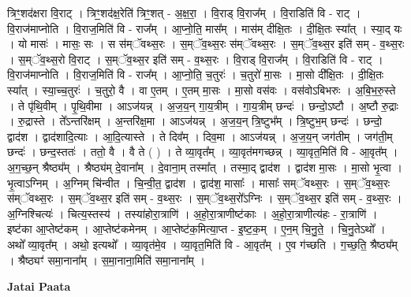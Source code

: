 \documentclass[17pt]{extarticle}
\begin{document}
त्रिꣳ॒॒शद॑क्षरा वि॒राट् । त्रिꣳ॒॒शद॑क्ष॒रेति॑ त्रिꣳ॒॒शत् - अ॒क्ष॒रा॒ । वि॒राड् वि॒राज᳚म् । वि॒राडिति॑ वि - राट् । वि॒राज॑माप्नोति । वि॒राज॒मिति॑ वि - राज᳚म् । आ॒प्नो॒ति॒ मास᳚म् । मास॑म् दीक्षि॒तः । दी॒क्षि॒तः स्या᳚त् । स्या॒द् यः । यो मासः॑ । मासः॒ सः । स स॑म्ॅवथ्स॒रः । स॒म्ॅव॒थ्स॒रः स॑म्ॅवथ्स॒रः । स॒म्ॅव॒थ्स॒र इति॑ सम् - व॒थ्स॒रः । स॒म्ॅव॒थ्स॒रो वि॒राट् । स॒म्ॅव॒थ्स॒र इति॑ सम् - व॒थ्स॒रः । वि॒राड् वि॒राज᳚म् । वि॒राडिति॑ वि - राट् । वि॒राज॑माप्नोति । वि॒राज॒मिति॑ वि - राज᳚म् । आ॒प्नो॒ति॒ च॒तुरः॑ । च॒तुरो॑ मा॒सः । मा॒सो दी᳚क्षि॒तः । दी॒क्षि॒तः स्या᳚त् । स्या॒च्च॒तुरः॑ । च॒तुरो॒ वै । वा ए॒तम् । ए॒तम् मा॒सः । मा॒सो वस॑वः । वस॑वोऽबिभरुः । अ॒बि॒भ॒रु॒स्ते । ते पृ॑थि॒वीम् । पृ॒थि॒वीमा । आऽज॑यन्न् । अ॒ज॒य॒न् गा॒य॒त्रीम् । गा॒य॒त्रीम् छन्दः॑ । छन्दो॒ऽष्टौ । अ॒ष्टौ रु॒द्राः । रु॒द्रास्ते । ते᳚ऽन्तरि॑क्षम् । अ॒न्तरि॑क्ष॒मा । आऽज॑यन्न् । अ॒ज॒य॒न् त्रि॒ष्टुभ᳚म् । त्रि॒ष्टुभ॒म् छन्दः॑ । छन्दो॒ द्वाद॑श । द्वाद॑शादि॒त्याः । आ॒दि॒त्यास्ते । ते दिव᳚म् । दिव॒मा । आऽज॑यन्न् । अ॒ज॒य॒न् जग॑तीम् । जग॑ती॒म् छन्दः॑ । छन्द॒स्ततः॑ । ततो॒ वै । वै ते ( ) । ते व्या॒वृत᳚म् । व्या॒वृत॑मगच्छन्न् । व्या॒वृत॒मिति॑ वि - आ॒वृत᳚म् । अ॒ग॒च्छ॒न् श्रैष्ठ्य᳚म् । श्रैष्ठ्य॑म् दे॒वाना᳚म् । दे॒वाना॒म् तस्मा᳚त् । तस्मा॒द् द्वाद॑श । द्वाद॑श मा॒सः । मा॒सो भृ॒त्वा । भृ॒त्वाऽग्निम् । अ॒ग्निम् चि॑न्वीत । चि॒न्वी॒त॒ द्वाद॑श । द्वाद॑श॒ मासाः᳚ । मासाः᳚ सम्ॅवथ्स॒रः । स॒म्ॅव॒थ्स॒रः स॑म्ॅवथ्स॒रः । स॒म्ॅव॒थ्स॒र इति॑ सम् - व॒थ्स॒रः । स॒म्ॅव॒थ्स॒रो᳚ऽग्निः । स॒म्ॅव॒थ्स॒र इति॑ सम् - व॒थ्स॒रः । अ॒ग्निश्चित्यः॑ । चित्य॒स्तस्य॑ । तस्या॑होरा॒त्राणि॑ । अ॒हो॒रा॒त्राणीष्ट॑काः । अ॒हो॒रा॒त्राणीत्य॑हः - रा॒त्राणि॑ । इष्ट॑का आ॒प्तेष्ट॑कम् । आ॒प्तेष्ट॑कमेनम् । आ॒प्तेष्ट॑क॒मित्या॒प्त - इ॒ष्ट॒क॒म् । ए॒न॒म् चि॒नु॒ते॒ । चि॒नु॒तेऽथो᳚ । अथो᳚ व्या॒वृत᳚म् । अथो॒ इत्यथो᳚ । व्या॒वृत॑मे॒व । व्या॒वृत॒मिति॑ वि - आ॒वृत᳚म् । ए॒व ग॑च्छति । ग॒च्छ॒ति॒ श्रैष्ठ्य᳚म् । श्रैष्ठ्यꣳ॑ समा॒नाना᳚म् । स॒मा॒नाना॒मिति॑ समा॒नाना᳚म् । \newline

\textbf{Jatai Paata} \newline
\end{document}
